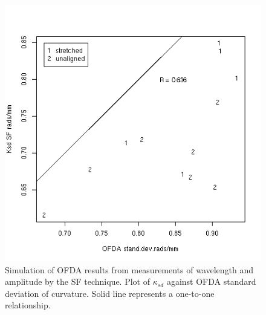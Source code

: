 %

\begin{figure}[!h]
  \centering
  \includegraphics[width=1.0\textwidth]{figofdasimsfsd.png}
  \caption{Simulation of OFDA results from measurements of wavelength and amplitude by the SF technique. Plot of $\kappa_{sd}$ against OFDA standard deviation of curvature. Solid line represents a one-to-one relationship.}
\label{fig:ofdasimsfsd}
\end{figure}

%

